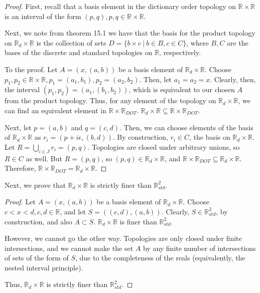 \documentclass[11pt]{article}
\begin{document}
\begin{proof}


First, recall that a basis element in the dictionary order topology on
\(\mathbb{R}\times\mathbb{R}\) is an interval of the form \((p,q), p,q \in
\mathbb{R}\times\mathbb{R}\).

Next, we note from theorem 15.1 we have that the basis for the product topology
on \(\mathbb{R}_d\times\mathbb{R}\) is the collection of sets \(D = \{ b\times
c\ |\ b\in B, c\in C\}\), where \(B,C\) are the bases of the discrete and standard
topologies on \(\mathbb{R}\), respectively.

To the proof. Let \(A = ({x},(a,b))\) be a basis element of
\(\mathbb{R}_d\times\mathbb{R}\). Choose \(p_1, p_2 \in \mathbb{R}\times\mathbb{R},
p_1 = (a_1,b_1), p_2 = (a_2,b_2)\). Then, let \(a_1 = a_2 = x\). Clearly, then, the
interval \((p_1,p_2) = ({a_1},(b_1,b_2))\), which is equivalent to our chosen \(A\)
from the product topology. Thus, for any element of the topology on
\(\mathbb{R}_d\times\mathbb{R}\), we can find an equivalent element in
\(\mathbb{R}\times\mathbb{R}_{DOT}\).
\(\mathbb{R}_d\times\mathbb{R}\subseteq\mathbb{R}\times\mathbb{R}_{DOT}\).

Next, let \(p = (a,b)\) and \(q = (c,d)\). Then, we can choose elements of the basis
of \(\mathbb{R}_d\times\mathbb{R}\) as \(r_i = ({p + i\epsilon}, (b,d))\). By
construction, \(r_i \in C\), the basis on \(\mathbb{R}_d\times\mathbb{R}\). Let \(R =
\bigcup\limits_{i \in J}r_i = (p,q)\). Topologies are closed under arbitrary
unions, so \(R \in C\) as well. But \(R = (p,q)\), so \((p,q) \in
\mathbb{R}_d\times\mathbb{R}\), and
\(\mathbb{R}\times\mathbb{R}_{DOT}\subseteq\mathbb{R}_d\times\mathbb{R}\).
Therefore, \(\mathbb{R}\times\mathbb{R}_{DOT} = \mathbb{R}_d\times\mathbb{R}\).
\end{proof}

Next, we prove that \(\mathbb{R}_d\times\mathbb{R}\) is strictly finer than
\(\mathbb{R}^2_{std}\).

\begin{proof}


Let \(A = ({x},(a,b))\) be a basis element of \(\mathbb{R}_d\times\mathbb{R}\).
Choose \(c < x < d, c,d \in\mathbb{R}\), and let \(S = ((c,d),(a,b))\). Clearly, \(S
\in \mathbb{R}^2_{std}\), by construction, and also \(A \subset S\).
\(\mathbb{R}_d\times\mathbb{R}\) is finer than \(\mathbb{R}^2_{std}\).

However, we cannot go the other way. Topologies are only closed under finite
intersections, and we cannot make the set \(A\) by any finite number of
intersections of sets of the form of \(S\), due to the completeness of the reals
(equivalently, the nested interval principle).

Thus, \(\mathbb{R}_d\times\mathbb{R}\) is strictly finer than
\(\mathbb{R}^2_{std}\).
\end{proof}
\end{document}
